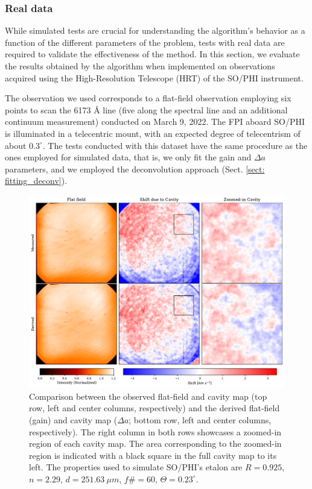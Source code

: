 \subsubsection{Real data}

While simulated tests are crucial for understanding the algorithm's behavior as a function of the different parameters of the problem, tests with real data are required to validate the effectiveness of the method. In this section, we evaluate the results obtained by the algorithm when implemented on observations acquired using the High-Resolution Telescope (HRT) of the SO/PHI instrument. 

The observation we used corresponds to a flat-field observation employing six points to scan the 6173 \r{A} line (five along the spectral line and an additional continuum measurement) conducted on March 9, 2022. The FPI aboard SO/PHI is illuminated in a telecentric mount, with an expected degree of telecentrism of about $0.3^\circ$. The tests conducted with this dataset have the same procedure as the ones employed for simulated data, that is, we only fit the gain and $\Delta a$ parameters, and we employed the deconvolution approach (Sect. \ref{sect: fitting_deconv}).

\begin{figure}
  \includegraphics[width=\textwidth]{figures/EtalonPaper/Comparison_HRT.pdf}
  \caption{Comparison between the observed flat-field and cavity map (top row, left and center columns, respectively) and the derived flat-field (gain) and cavity map ($\Delta a$; bottom row, left and center columns, respectively). The right column in both rows showcases a zoomed-in region of each cavity map. The area corresponding to the zoomed-in region is indicated with a black square in the full cavity map to its left. The properties used to simulate SO/PHI's etalon are $R = 0.925$, $n=2.29$, $d = 251.63\ \mu m$, $f\# = 60$, $\Theta = 0.23 ^{\circ}$.\label{fig_etalon_corr:HRT}}  
\end{figure}


